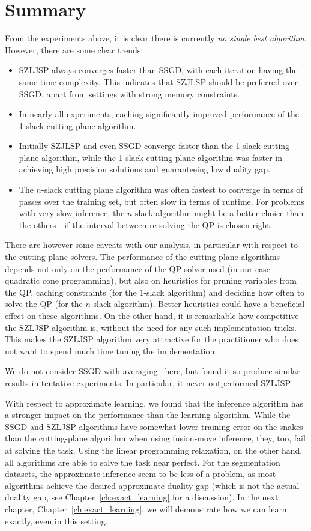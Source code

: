 \section{Summary}
From the experiments above, it is clear there is currently \emph{no single best algorithm}.
However, there are some clear trends:
\begin{itemize}
    \item SZLJSP always converges faster than SSGD, with each iteration having
        the same time complexity.  This indicates that SZJLSP should be
        preferred over SSGD, apart from settings with strong memory
        constraints.
    \item In nearly all experiments, caching significantly improved performance
        of the 1-slack cutting plane algorithm.
    \item Initially SZJLSP and even SSGD converge faster than the 1-slack
        cutting plane algorithm, while the 1-slack cutting plane algorithm was
        faster in achieving high precision solutions and guaranteeing low
        duality gap.
    \item The $n$-slack cutting plane algorithm was often fastest to converge in
        terms of passes over the training set, but often slow in terms of
        runtime. For problems with very slow inference, the $n$-slack algorithm
        might be a better choice than the others---if the interval between re-solving
        the QP is chosen right.
\end{itemize}
There are however some caveats with our analysis, in particular with respect to
the cutting plane solvers. The performance of the cutting plane algorithms
depends not only on the performance of the QP solver used (in our case
quadratic cone programming), but also on heuristics for pruning variables from
the QP, caching constraints (for the $1$-slack algorithm) and deciding how
often to solve the QP (for the $n$-slack algorithm). Better heuristics could
have a beneficial effect on these algorithms. On the other hand, it is
remarkable how competitive the SZLJSP algorithm is, without the need for any
such implementation tricks. This makes the SZLJSP algorithm very attractive for
the practitioner who does not want to spend much time tuning the
implementation.

We do not consider SSGD with averaging~\cite{lacoste2012simpler} here, but
found it so produce similar results in tentative experiments. In particular, it
never outperformed SZLJSP.

With respect to approximate learning, we found that the inference algorithm has
a stronger impact on the performance than the learning algorithm.
While the SSGD and SZLJSP algorithms have somewhat lower training error on the snakes than
the cutting-plane algorithm when using fusion-move inference, they, too, fail at solving the task.
Using the linear programming relaxation, on the other hand, all algorithms are able to solve the
task near perfect.
For the segmentation datasets, the approximate inference seem to be less of a
problem, as most algorithms achieve the desired approximate duality gap (which
is not the actual duality gap, see Chapter~\ref{ch:exact_learning} for a
discussion).
In the next chapter, Chapter~\ref{ch:exact_learning}, we will demonstrate how
we can learn exactly, even in this setting.
